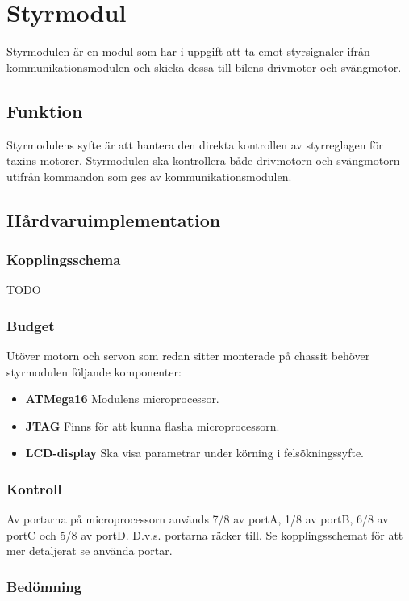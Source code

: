 \documentclass[designspec/spec.tex]{subfiles}
\begin{document}
\section{Styrmodul}
Styrmodulen är en modul som har i uppgift att ta emot styrsignaler ifrån
kommunikationsmodulen och skicka dessa till bilens drivmotor och svängmotor.

\subsection{Funktion}
Styrmodulens syfte är att hantera den direkta kontrollen av styrreglagen för
taxins motorer. Styrmodulen ska kontrollera både drivmotorn och svängmotorn
utifrån kommandon som ges av kommunikationsmodulen.

\subsection{Hårdvaruimplementation}

\subsubsection{Kopplingsschema}
TODO
\subsubsection{Budget}
Utöver motorn och servon som redan sitter monterade på chassit behöver
styrmodulen följande komponenter:

\begin{itemize}
	\item \textbf{ATMega16} Modulens microprocessor. 
	\item \textbf{JTAG} Finns för att kunna flasha microprocessorn. 
	\item \textbf{LCD-display} Ska visa parametrar under körning i
	felsökningssyfte.
\end{itemize}

\subsubsection{Kontroll}
Av portarna på microprocessorn används 7/8 av portA, 1/8 av portB, 6/8 av portC
och 5/8 av portD. D.v.s. portarna räcker till.
Se kopplingsschemat för att mer detaljerat se använda portar.

\subsubsection{Bedömning}
\end{document}
